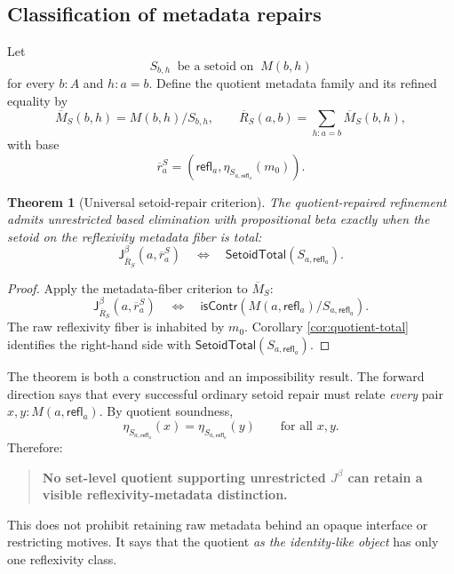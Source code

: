 \documentclass[10pt,reqno]{amsart}
\newtheorem{theorem}{Theorem}[section]
\newcommand{\isContr}{\mathsf{isContr}}
\newcommand{\Jbeta}{\mathsf J^\beta}
\newcommand{\refl}{\mathsf{refl}}
\newcommand{\SetTot}{\mathsf{SetoidTotal}}
\begin{document}
\subsection{Classification of metadata repairs}

Let
\[
 S_{b,h}\ \text{ be a setoid on }\ M(b,h)
\tag{5.2}\label{eq:setoid-family}
\]
for every \(b:A\) and \(h:a=b\).  Define the quotient metadata family and its
refined equality by
\[
 \overline M_S(b,h)=M(b,h)/S_{b,h},
 \qquad
 \overline R_S(a,b)=\sum_{h:a=b}\overline M_S(b,h),
\tag{5.3}\label{eq:quotient-metadata}
\]
with base
\[
       \overline r^S_a=(\refl_a,\eta_{S_{a,\refl_a}}(m_0)).
\tag{5.4}\label{eq:quotient-metadata-base}
\]

\begin{theorem}[Universal setoid-repair criterion]
\label{thm:universal-repair}
The quotient-repaired refinement admits unrestricted based elimination with
propositional beta exactly when the setoid on the reflexivity metadata fiber is
total:
\[
 \Jbeta_{\overline R_S}(a,\overline r^S_a)
 \quad\Longleftrightarrow\quad
 \SetTot(S_{a,\refl_a}).
\tag{5.5}\label{eq:universal-repair}
\]
\end{theorem}

\begin{proof}
Apply the metadata-fiber criterion to \(\overline M_S\):
\[
 \Jbeta_{\overline R_S}(a,\overline r^S_a)
 \quad\Longleftrightarrow\quad
 \isContr\!\left(M(a,\refl_a)/S_{a,\refl_a}\right).
\tag{5.6}\label{eq:repair-first-step}
\]
The raw reflexivity fiber is inhabited by \(m_0\).  Corollary
\ref{cor:quotient-total} identifies the right-hand side with
\(\SetTot(S_{a,\refl_a})\).
\end{proof}

The theorem is both a construction and an impossibility result.  The forward
direction says that every successful ordinary setoid repair must relate
\emph{every} pair \(x,y:M(a,\refl_a)\).  By quotient soundness,
\[
             \eta_{S_{a,\refl_a}}(x)
             =
             \eta_{S_{a,\refl_a}}(y)
             \qquad\text{for all }x,y.
\tag{5.7}\label{eq:no-visible-reflexivity}
\]
Therefore:
\begin{quote}
\centering\bfseries
No set-level quotient supporting unrestricted \(J^\beta\) can retain a
visible reflexivity-metadata distinction.
\end{quote}
This does not prohibit retaining raw metadata behind an opaque interface or
restricting motives.  It says that the quotient \emph{as the identity-like
object} has only one reflexivity class.
\end{document}
